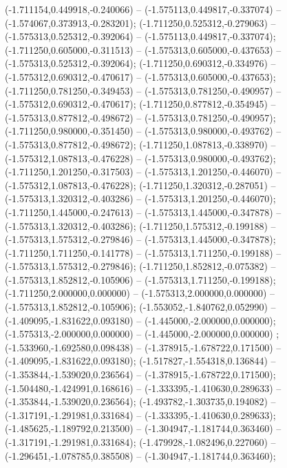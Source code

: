  (-1.711154,0.449918,-0.240066) -- (-1.575113,0.449817,-0.337074) -- (-1.574067,0.373913,-0.283201);
 (-1.711250,0.525312,-0.279063) -- (-1.575313,0.525312,-0.392064) -- (-1.575113,0.449817,-0.337074);
 (-1.711250,0.605000,-0.311513) -- (-1.575313,0.605000,-0.437653) -- (-1.575313,0.525312,-0.392064);
 (-1.711250,0.690312,-0.334976) -- (-1.575312,0.690312,-0.470617) -- (-1.575313,0.605000,-0.437653);
 (-1.711250,0.781250,-0.349453) -- (-1.575313,0.781250,-0.490957) -- (-1.575312,0.690312,-0.470617);
 (-1.711250,0.877812,-0.354945) -- (-1.575313,0.877812,-0.498672) -- (-1.575313,0.781250,-0.490957);
 (-1.711250,0.980000,-0.351450) -- (-1.575313,0.980000,-0.493762) -- (-1.575313,0.877812,-0.498672);
 (-1.711250,1.087813,-0.338970) -- (-1.575312,1.087813,-0.476228) -- (-1.575313,0.980000,-0.493762);
 (-1.711250,1.201250,-0.317503) -- (-1.575313,1.201250,-0.446070) -- (-1.575312,1.087813,-0.476228);
 (-1.711250,1.320312,-0.287051) -- (-1.575313,1.320312,-0.403286) -- (-1.575313,1.201250,-0.446070);
 (-1.711250,1.445000,-0.247613) -- (-1.575313,1.445000,-0.347878) -- (-1.575313,1.320312,-0.403286);
 (-1.711250,1.575312,-0.199188) -- (-1.575313,1.575312,-0.279846) -- (-1.575313,1.445000,-0.347878);
 (-1.711250,1.711250,-0.141778) -- (-1.575313,1.711250,-0.199188) -- (-1.575313,1.575312,-0.279846);
 (-1.711250,1.852812,-0.075382) -- (-1.575313,1.852812,-0.105906) -- (-1.575313,1.711250,-0.199188);
 (-1.711250,2.000000,0.000000) -- (-1.575313,2.000000,0.000000) -- (-1.575313,1.852812,-0.105906);
 (-1.553052,-1.840762,0.052990) -- (-1.409095,-1.831622,0.093180) -- (-1.445000,-2.000000,0.000000);
 (-1.575313,-2.000000,0.000000) -- (-1.445000,-2.000000,0.000000) ;
 (-1.533960,-1.692580,0.098438) -- (-1.378915,-1.678722,0.171500) -- (-1.409095,-1.831622,0.093180);
 (-1.517827,-1.554318,0.136844) -- (-1.353844,-1.539020,0.236564) -- (-1.378915,-1.678722,0.171500);
 (-1.504480,-1.424991,0.168616) -- (-1.333395,-1.410630,0.289633) -- (-1.353844,-1.539020,0.236564);
 (-1.493782,-1.303735,0.194082) -- (-1.317191,-1.291981,0.331684) -- (-1.333395,-1.410630,0.289633);
 (-1.485625,-1.189792,0.213500) -- (-1.304947,-1.181744,0.363460) -- (-1.317191,-1.291981,0.331684);
 (-1.479928,-1.082496,0.227060) -- (-1.296451,-1.078785,0.385508) -- (-1.304947,-1.181744,0.363460);
